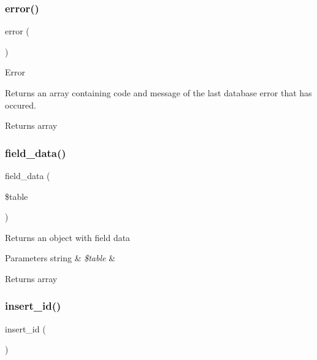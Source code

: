 \subsubsection{\texorpdfstring{error()}{error()}}
{\footnotesize\ttfamily error (\begin{DoxyParamCaption}{ }\end{DoxyParamCaption})}

Error

Returns an array containing code and message of the last database error that has occured.

\begin{DoxyReturn}{Returns}
array 
\end{DoxyReturn}
\mbox{\label{class_c_i___d_b__sqlite__driver_a90355121e1ed009e0efdbd544ab56efa}} 
\subsubsection{\texorpdfstring{field\+\_\+data()}{field\_data()}}
{\footnotesize\ttfamily field\+\_\+data (\begin{DoxyParamCaption}\item[{}]{\$table }\end{DoxyParamCaption})}

Returns an object with field data


\begin{DoxyParams}[1]{Parameters}
string & {\em \$table} & \\
\hline
\end{DoxyParams}
\begin{DoxyReturn}{Returns}
array 
\end{DoxyReturn}
\mbox{\label{class_c_i___d_b__sqlite__driver_a933f2cde8dc7f87875e257d0a4902e99}} 
\subsubsection{\texorpdfstring{insert\+\_\+id()}{insert\_id()}}
{\footnotesize\ttfamily insert\+\_\+id (\begin{DoxyParamCaption}{ }\end{DoxyParamCaption})}

